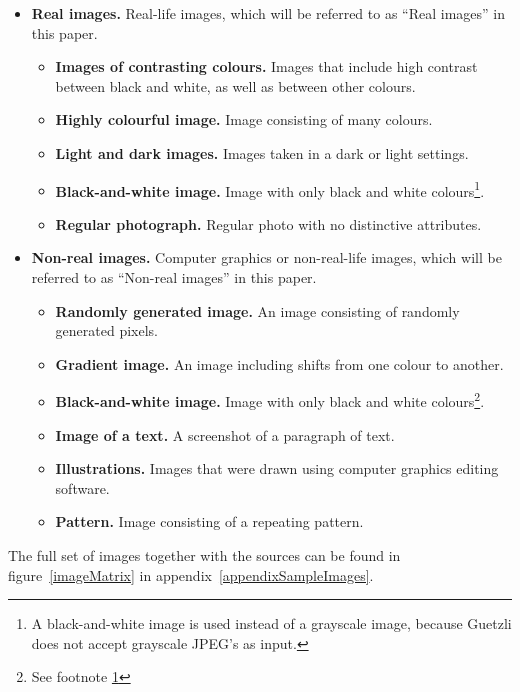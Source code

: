 \documentclass[12pt]{article}
\begin{document}
\begin{itemize}
	\item \textbf{Real images.} Real-life images, which will be referred to as ``Real images'' in this paper.
		\begin{itemize}
			\item \textbf{Images of contrasting colours.} Images that include high contrast between black and white, as well as between other colours.
			\item \textbf{Highly colourful image.} Image consisting of many colours.
			\item \textbf{Light and dark images.} Images taken in a dark or light settings.
			\item \textbf{Black-and-white image.} Image with only black and white colours\footnote{\label{footnote1}A black-and-white image is used instead of a grayscale image, because Guetzli does not accept grayscale JPEG's as input.}.
			\item \textbf{Regular photograph.} Regular photo with no distinctive attributes.
		\end{itemize}
	\item \textbf{Non-real images.} Computer graphics or non-real-life images, which will be referred to as ``Non-real images'' in this paper.
		\begin{itemize}
			\item \textbf{Randomly generated image.} An image consisting of randomly generated pixels.
			\item \textbf{Gradient image.} An image including shifts from one colour to another.
			\item \textbf{Black-and-white image.} Image with only black and white colours\footnote{See footnote \ref{footnote1}}.
			\item \textbf{Image of a text.} A screenshot of a paragraph of text.
			\item \textbf{Illustrations.} Images that were drawn using computer graphics editing software.
			\item \textbf{Pattern.} Image consisting of a repeating pattern.
		\end{itemize}
\end{itemize}
The full set of images together with the sources can be found in figure~\ref{imageMatrix} in appendix~\ref{appendixSampleImages}.
\end{document}
